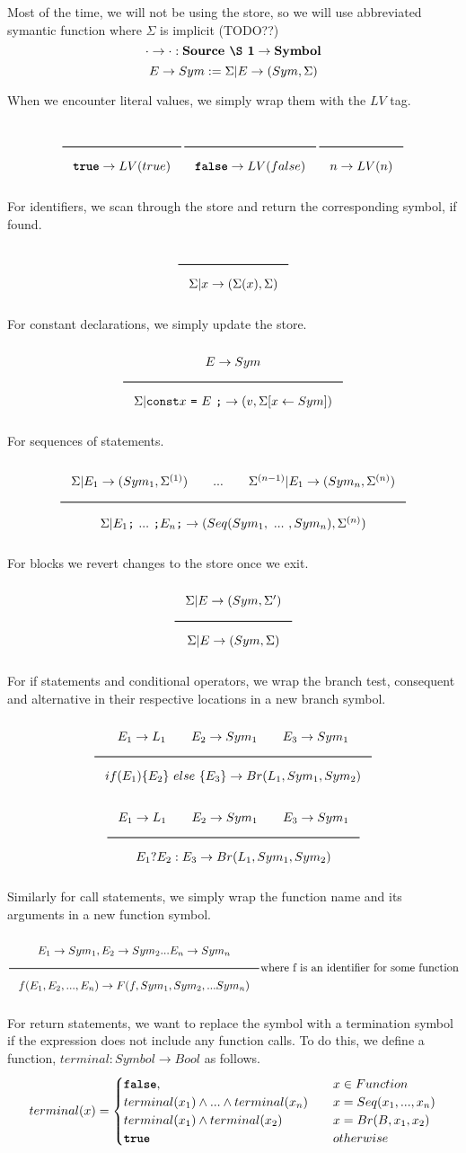 Most of the time, we will not be using the store, so we will use abbreviated symantic function where $\Sigma$ is implicit (TODO??)
\[
\cdot \eval \cdot : 
\textbf{Source \S 1} \rightarrow \textbf{Symbol}
\]
\[
E \to Sym := \Sigma | E \to (Sym, \Sigma)
\]


\noindent
When we encounter literal values, we simply wrap them with the $LV$ tag.

\[
\Rule{}{\TruE \eval LV(true)} \hfill
\Rule{}{\FalsE \eval LV(false)} \hfill
\Rule{}{n \eval LV(n)}
\]

\noindent
For identifiers, we scan through the store and return the corresponding symbol, if found.
\[
\Rule{}{
\Sigma \under x \eval (\Sigma(x),\Sigma)}
\]

\noindent
For constant declarations, we simply update the store.

\[
\Rule{
E \eval Sym}{
\Sigma \under \texttt{const} x\ \texttt{=}\ E\ \texttt{;} \eval (v,\Sigma[x \leftarrow Sym])}
\]

\noindent
For sequences of statements.

\[
\Rule{
\Sigma \under E_1 \eval (Sym_1,\Sigma^{(1)}) \qquad ... \qquad \Sigma^{(n-1)} \under E_1 \eval (Sym_n,\Sigma^{(n)})}{
\Sigma \under E_1 \texttt{;}\ ...\ \texttt{;} E_n \texttt{;} \eval (Seq(Sym_1,\ ...\ ,Sym_n),\Sigma^{(n)})}
\]

\noindent
For blocks we revert changes to the store once we exit.

\[
\Rule{
\Sigma \under E \eval (Sym,\Sigma')}{
\Sigma \under {E} \eval (Sym,\Sigma)}
\]

\noindent
For if statements and conditional operators, we wrap the branch test, consequent and alternative in their respective locations in a new branch symbol.

\[
\Rule{E_1 \eval L_1 \qquad E_2 \eval Sym_1 \qquad E_3 \eval Sym_1}
      {if(E_1)\{E_2\}~else~\{E_3\} \eval Br(L_1,Sym_1,Sym_2)}
\]
\[
\Rule{E_1 \eval L_1 \qquad E_2 \eval Sym_1 \qquad E_3 \eval Sym_1}
      {E_1?E_2:E_3 \eval Br(L_1,Sym_1,Sym_2)}
\]
      
\noindent
Similarly for call statements, we simply wrap the function name and its arguments in a new function symbol.

\[
\Rule{E_1 \eval Sym_1, E_2 \eval Sym_2 ... E_n \eval Sym_n}
{f(E_1,E_2,...,E_n) \eval F(f,Sym_1,Sym_2,...Sym_n)}
\text{where f is an identifier for some function}
\]
      
\noindent
For return statements, we want to replace the symbol with a termination symbol if the expression does not include any function calls.
To do this, we define a function, $terminal : Symbol \to Bool$ as follows.
\[
  terminal(x) =
  \begin{cases}
    \textbf{\texttt{false}}, &\quad x \in Function \\
    terminal(x_1)\land ... \land terminal(x_n) &\quad x = Seq(x_1,...,x_n) \\
    terminal(x_1)\land terminal(x_2) &\quad x = Br(B,x_1,x_2) \\
    \textbf{\texttt{true}} &\quad otherwise \\
  \end{cases}
\]

